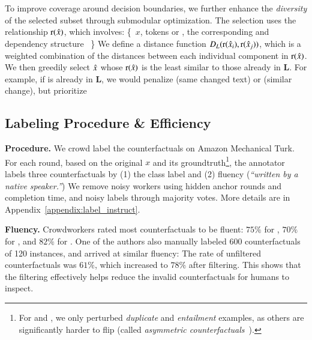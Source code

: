 To improve coverage around decision boundaries, we further enhance the \emph{diversity} of the selected subset through submodular optimization.
The selection uses the relationship $\operatorname*{r}(\hat{x})$, which involves: \{\ $x$, tokens  or , the corresponding \tagstr and dependency structure \ \}
We define a distance function $D_L(\operatorname*{r}(\hat{x}_i), \operatorname*{r}(\hat{x}_j))$, which is a weighted combination of the distances between each individual component in $\operatorname*{r}(\hat{x})$.
We then greedily select $\hat{x}$ whose $\operatorname*{r}(\hat{x})$ is the least similar to those already in $\mathbf{L}$.
For example, if  is already in $\mathbf{L}$, we would penalize  (same changed text) or  (similar  change), but prioritize 




\TableContrastSet

\subsection{Labeling Procedure \& Efficiency}
\label{subsec:label_efficiency}

\textbf{Procedure.}
We crowd label the counterfactuals on Amazon Mechanical Turk. 
For each round, based on the original $x$ and its groundtruth\footnote{For \qqp and \nli, we only perturbed \emph{duplicate} and \emph{entailment} examples, as others are significantly harder to flip (called \emph{asymmetric counterfactuals}~\cite{garg2019counterfactual}).}, the annotator labels three counterfactuals by (1) the class label and (2) fluency (\emph{``written by a native speaker.''}) 
We remove noisy workers using hidden anchor rounds and completion time, and noisy labels through majority votes.
More details are in Appendix~\ref{appendix:label_instruct}. 

\textbf{Fluency.}
Crowdworkers rated most counterfactuals to be fluent: $75\%$ for \dsst, $70\%$ for \dqqp, and $82\%$ for \dnli.
One of the authors also manually labeled 600 counterfactuals of 120 instances, and arrived at similar fluency:
The rate of unfiltered counterfactuals was $61\%$, which increased to $78\%$ after filtering. This shows that the filtering effectively helps reduce the invalid counterfactuals for humans to inspect.

